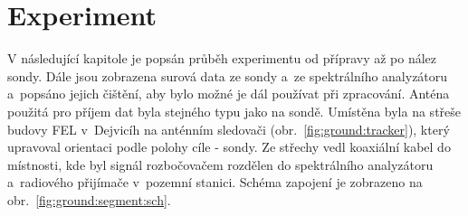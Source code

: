 \documentclass[twoside]{ctuthesis}
\theoremstyle{plain}
\theoremstyle{definition}
\theoremstyle{note}
\begin{document}
\chapter{Experiment}
\label{chap:expoeriment}
	V následující kapitole je popsán průběh experimentu od přípravy až po nález sondy. Dále jsou zobrazena surová data ze sondy a~ze spektrálního analyzátoru a~popsáno jejich čištění, aby bylo možné je dál používat při zpracování. Anténa použitá pro příjem dat byla stejného typu jako na sondě. Umístěna byla na střeše budovy FEL v~Dejvicíh na anténním sledovači (obr.~\ref{fig:ground:tracker}), který upravoval orientaci podle polohy cíle - sondy. Ze střechy vedl koaxiální kabel do místnosti, kde byl signál rozbočovačem rozdělen do spektrálního analyzátoru a~radiového přijímače v~pozemní stanici. Schéma zapojení je zobrazeno na obr.~\ref{fig:ground:segment:sch}.
\end{document}
